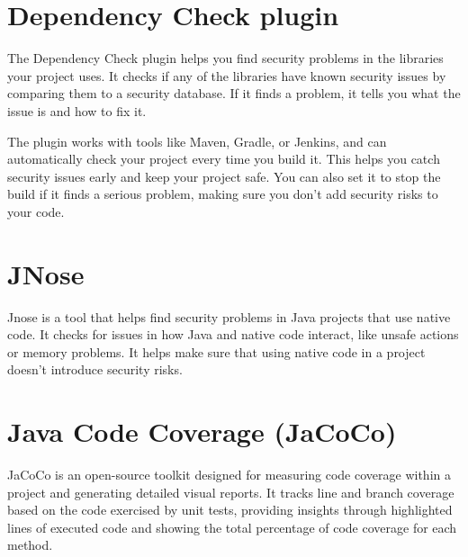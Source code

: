 \documentclass[a4paper,11pt,openright,BCOR=15mm]{scrbook}
\begin{document}
	\section{Dependency Check plugin}
	The Dependency Check plugin helps you find security problems in the libraries your project uses. It checks if any of the libraries have known security issues by comparing them to a security database. If it finds a problem, it tells you what the issue is and how to fix it.
	
	The plugin works with tools like Maven, Gradle, or Jenkins, and can automatically check your project every time you build it. This helps you catch security issues early and keep your project safe. You can also set it to stop the build if it finds a serious problem, making sure you don’t add security risks to your code.
	
	\section{JNose}
	Jnose is a tool that helps find security problems in Java projects that use native code. It checks for issues in how Java and native code interact, like unsafe actions or memory problems. It helps make sure that using native code in a project doesn’t introduce security risks.
	
	\section{Java Code Coverage (JaCoCo)}
	JaCoCo is an open-source toolkit designed for measuring code coverage within a project and generating detailed visual reports. It tracks line and branch coverage based on the code exercised by unit tests, providing insights through highlighted lines of executed code and showing the total percentage of code coverage for each method.
	
\end{document}
